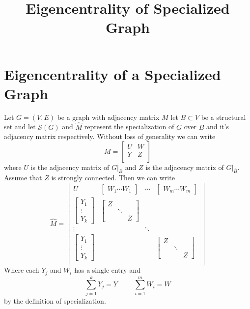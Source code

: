 \documentclass{article}
\begin{document}
\title{Eigencentrality of Specialized Graph}
\section*{Eigencentrality of a Specialized Graph}

Let $G = (V,E)$ be a graph with adjacency matrix $M$ let $B \subset V$ be a structural set and let $\mathcal{S}(G)$ and $\hat{M}$ represent the specialization of $G$ over $B$ and it's adjacency matrix respectively. Without loss of generality we can write
\[M = \begin{bmatrix} U & W \\ Y & Z \\ \end{bmatrix} \] where $U$ is the adjacency matrix of $G|_{B}$ and $Z$ is the adjacency matrix of $G|_{\bar{B}}$. Assume that $Z$ is strongly connected. Then we can write 
\[\hat{M} = 
\begin{bmatrix}
	U & \begin{bmatrix}W_1\cdots W_1 \end{bmatrix} & \cdots & \begin{bmatrix}W_m\cdots W_m \end{bmatrix} \\

	\begin{bmatrix} Y_1 \\ \vdots \\ Y_k \end{bmatrix} & \begin{bmatrix} Z \\ & \ddots \\ & & Z \end{bmatrix} \\
	
	\vdots & & \ddots & \\
	
	\begin{bmatrix} Y_1 \\ \vdots \\ Y_k \end{bmatrix} & & & \begin{bmatrix} Z \\ & \ddots \\ & & Z \end{bmatrix} \\
	
\end{bmatrix}
\]
Where each $Y_j$ and $W_i$ has a single entry and 
\[\sum_{j=1}^{k} Y_j = Y \hspace{1cm} \sum_{i=1}^{m} W_i = W\]
by the definition of specialization.
\end{document}

